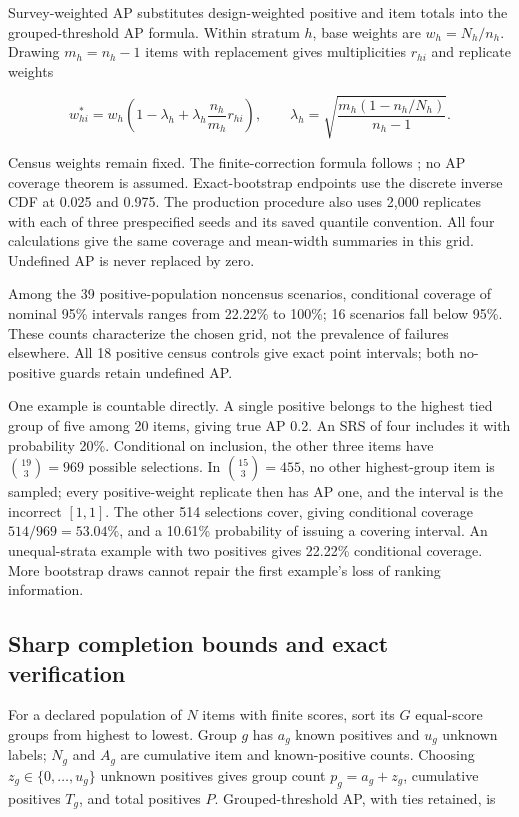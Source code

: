 \documentclass[preprint,12pt]{elsarticle}
\begin{document}
Survey-weighted AP substitutes design-weighted positive and item totals into the grouped-threshold AP formula. Within stratum \(h\), base weights are \(w_h=N_h/n_h\). Drawing \(m_h=n_h-1\) items with replacement gives multiplicities \(r_{hi}\) and replicate weights

\[
w^*_{hi}=w_h\left(1-\lambda_h+\lambda_h\frac{n_h}{m_h}r_{hi}\right),
\qquad \lambda_h=\sqrt{\frac{m_h(1-n_h/N_h)}{n_h-1}}.
\]

Census weights remain fixed. The finite-correction formula follows \cite{hfcn2023methodological}; no AP coverage theorem is assumed. Exact-bootstrap endpoints use the discrete inverse CDF at 0.025 and 0.975. The production procedure also uses 2,000 replicates with each of three prespecified seeds and its saved quantile convention. All four calculations give the same coverage and mean-width summaries in this grid. Undefined AP is never replaced by zero.

Among the 39 positive-population noncensus scenarios, conditional coverage of nominal 95\% intervals ranges from 22.22\% to 100\%; 16 scenarios fall below 95\%. These counts characterize the chosen grid, not the prevalence of failures elsewhere. All 18 positive census controls give exact point intervals; both no-positive guards retain undefined AP.

One example is countable directly. A single positive belongs to the highest tied group of five among 20 items, giving true AP 0.2. An SRS of four includes it with probability 20\%. Conditional on inclusion, the other three items have \(\binom{19}{3}=969\) possible selections. In \(\binom{15}{3}=455\), no other highest-group item is sampled; every positive-weight replicate then has AP one, and the interval is the incorrect \([1,1]\). The other 514 selections cover, giving conditional coverage \(514/969=53.04\%\), and a 10.61\% probability of issuing a covering interval. An unequal-strata example with two positives gives 22.22\% conditional coverage. More bootstrap draws cannot repair the first example's loss of ranking information.

\subsection{Sharp completion bounds and exact verification}\label{sharp-completion-bounds-and-exact-verification}

For a declared population of \(N\) items with finite scores, sort its \(G\) equal-score groups from highest to lowest. Group \(g\) has \(a_g\) known positives and \(u_g\) unknown labels; \(N_g\) and \(A_g\) are cumulative item and known-positive counts. Choosing \(z_g\in\{0,\ldots,u_g\}\) unknown positives gives group count \(p_g=a_g+z_g\), cumulative positives \(T_g\), and total positives \(P\). Grouped-threshold AP, with ties retained, is
\end{document}
